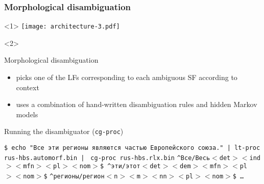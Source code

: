 \documentclass[10pt,xetex]{beamer} %
\begin{document}
\begin{frame}
  \frametitle{Morphological disambiguation}


\begin{onlyenv}<1>
\texttt{[image: architecture-3.pdf]}
\end{onlyenv}
\begin{onlyenv}<2>

  \begin{block}{Morphological disambiguation}
 \begin{itemize}
  \item picks one of the LFs corresponding to each ambiguous SF according to context
  \item uses a combination of hand-written disambiguation rules and hidden Markov models
 \end{itemize}
  \end{block}
  \begin{block}{Running the disambiguator ({\tt cg-proc})} %
  \begin{small}
    \texttt{\$ echo "Все эти регионы являются частью Европейского союза." | lt-proc rus-hbs.automorf.bin |}
    \texttt{     cg-proc rus-hbs.rlx.bin}
    \texttt{\^{}Все/Весь$<$det$><$ind$><$mfn$><$pl$><$nom$>$\$ \^{}эти/этот$<$det$><$dem$><$mfn$><$pl$><$nom$>$\$}
    \texttt{\^{}регионы/регион$<$n$><$m$><$nn$><$pl$><$nom$>$\$ \ldots}
  \end{small}
  \end{block}

\end{onlyenv}

\end{frame}
\end{document}
